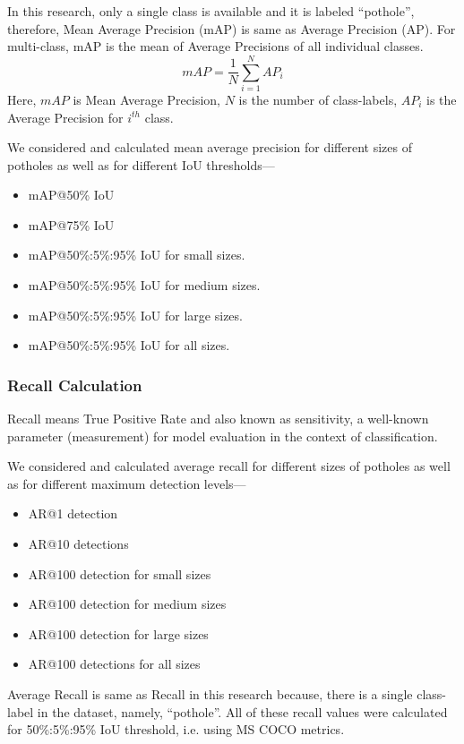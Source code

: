 \documentclass[conference]{IEEEtran}
\begin{document}
In this research, only a single class is available and it is labeled ``pothole'', therefore, Mean Average Precision (mAP) is same as Average Precision (AP). For multi-class, mAP is the mean of Average Precisions of all individual classes.
\begin{equation}
  mAP = \frac{1}{N} \sum_{i=1}^N AP_i
\end{equation}
Here, $mAP$ is Mean Average Precision, $N$ is the number of class-labels, $AP_i$ is the Average Precision for $i^{th}$ class.

We considered and calculated mean average precision for different  sizes of potholes as well as for different IoU thresholds---
\begin{itemize}
  \item mAP@50\% IoU
  \item mAP@75\% IoU
  \item mAP@50\%:5\%:95\% IoU for small sizes.
  \item mAP@50\%:5\%:95\% IoU for medium sizes.
  \item mAP@50\%:5\%:95\% IoU for large sizes.
  \item mAP@50\%:5\%:95\% IoU for all sizes.
\end{itemize}  
  
\subsubsection{Recall Calculation}
Recall means True Positive Rate and also known as sensitivity, a well-known parameter (measurement) for model evaluation in the context of classification\cite{wiki:precision_recall}.
            
We considered and calculated average recall for different  sizes of potholes as well as for different maximum detection levels---
\begin{itemize}
  \item AR@1 detection
  \item AR@10 detections
  \item AR@100 detection for small sizes
  \item AR@100 detection for medium sizes
  \item AR@100 detection for large sizes
  \item AR@100 detections for all sizes
\end{itemize}
Average Recall is same as Recall in this research because, there is a single class-label in the dataset, namely, ``pothole''.
All of these recall values were calculated for 50\%:5\%:95\% IoU threshold, i.e. using MS COCO metrics\cite{lin2014microsoft}.
    
\end{document}
